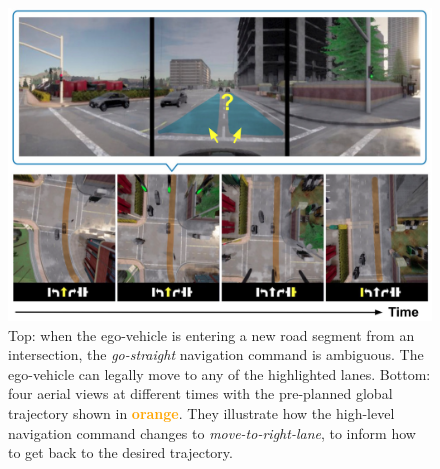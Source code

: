 \begin{figure}[t]
	\centering
	\includegraphics[width=1.0\linewidth]{fig/cmd_ambiguous.png}
	\caption{Top: when the ego-vehicle is entering a new road segment from an intersection, the \emph{go-straight} navigation command is ambiguous. 
	The ego-vehicle can legally move to any of the highlighted lanes. 
	Bottom: four aerial views at different times with the pre-planned global trajectory shown in \textbf{\textcolor{orange}{orange}}. 
	They illustrate how the high-level navigation command changes to \emph{move-to-right-lane}, to inform how to get back to the desired trajectory.}
	\label{fig:command_ambiguous}
\end{figure}


